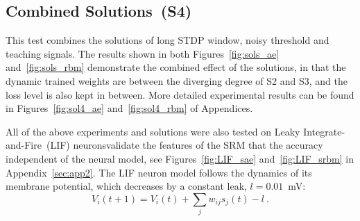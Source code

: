 \subsection{\DIFdelbegin {}\DIFdelend Combined Solutions~(S4)}
This test combines the solutions of long STDP window, noisy threshold and teaching signals.
The results shown in both Figures~\ref{fig:sols_ae} and~\ref{fig:sols_rbm} demonstrate the combined effect of the solutions, in that the dynamic trained weights are between the diverging degree of S2 and S3, and the loss level is also kept in between.
More detailed experimental results can be found in Figures~\ref{fig:sol4_ae} and~\ref{fig:sol4_rbm} of Appendices.
\DIFaddbegin 

\DIFaddend All of the above experiments and solutions were also tested on Leaky Integrate-and-Fire~(LIF) neurons\DIFdelbegin {}\DIFdelend \DIFaddbegin {}\DIFaddend validate the features of the SRM that the accuracy \DIFdelbegin {}\DIFdelend \DIFaddbegin {}\DIFaddend independent of the neural model, see Figures~\ref{fig:LIF_sae} and~\ref{fig:LIF_srbm} in Appendix~\ref{sec:app2}.
The LIF neuron model follows the dynamics of its membrane potential, which decreases by a constant leak, $l=0.01$~mV\DIFdelbegin {}\DIFdelend :
\begin{equation}
V_i(t+1)=V_i(t) + \sum_j w_{ij} s_j(t) - l~.
\end{equation}
